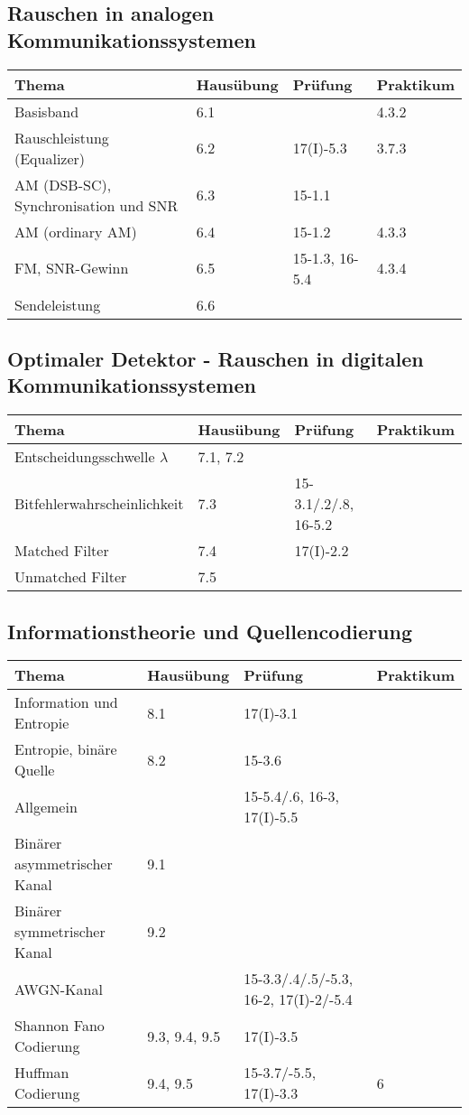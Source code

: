 \subsection{Rauschen in analogen Kommunikationssystemen}
	\begin{tabular}{|p{9cm}|p{2.5cm}|p{3.9cm}|p{1.6cm}|}
	\hline
	\textbf{Thema} & \textbf{Hausübung} & \textbf{Prüfung} & \textbf{Praktikum} \\ 
	\hline
	\hline
	Basisband & 6.1 & & 4.3.2\\
	\hline
	Rauschleistung (Equalizer) & 6.2 & 17(I)-5.3& 3.7.3\\
	\hline
	AM (DSB-SC), Synchronisation und SNR & 6.3 & 15-1.1& \\
	\hline
	AM (ordinary AM) & 6.4 & 15-1.2& 4.3.3\\
	\hline
	FM, SNR-Gewinn & 6.5 & 15-1.3, 16-5.4& 4.3.4\\
	\hline
	Sendeleistung & 6.6 & & \\
	\hline
	\end{tabular}
\subsection{Optimaler Detektor - Rauschen in digitalen Kommunikationssystemen}
	\begin{tabular}{|p{9cm}|p{2.5cm}|p{3.9cm}|p{1.6cm}|}
	\hline
	\textbf{Thema} & \textbf{Hausübung} & \textbf{Prüfung} & \textbf{Praktikum} \\ 
	\hline
	\hline
	Entscheidungsschwelle $\lambda$ & 7.1, 7.2 & & \\
	\hline
	Bitfehlerwahrscheinlichkeit & 7.3 & 15-3.1/.2/.8, 16-5.2& \\
	\hline
	Matched Filter & 7.4 & 17(I)-2.2& \\
	\hline
	Unmatched Filter & 7.5 & & \\
	\hline
	\end{tabular}
\subsection{Informationstheorie und Quellencodierung}
	\begin{tabular}{|p{9cm}|p{2.5cm}|p{3.9cm}|p{1.6cm}|}
	\hline
	\textbf{Thema} & \textbf{Hausübung} & \textbf{Prüfung} & \textbf{Praktikum} \\ 
	\hline
	\hline
	Information und Entropie & 8.1 & 17(I)-3.1& \\
	\hline
	Entropie, binäre Quelle & 8.2 & 15-3.6 & \\
	\hline
	Allgemein & & 15-5.4/.6, 16-3, 17(I)-5.5&\\
	\hline
	Binärer asymmetrischer Kanal & 9.1 & & \\
	\hline
	Binärer symmetrischer Kanal & 9.2 & & \\
	\hline
	AWGN-Kanal & & 15-3.3/.4/.5/-5.3, 16-2, 17(I)-2/-5.4 & \\
	\hline
	Shannon Fano Codierung & 9.3, 9.4, 9.5 & 17(I)-3.5 & \\
	\hline
	Huffman Codierung & 9.4, 9.5 & 15-3.7/-5.5, 17(I)-3.3& 6\\
	\hline
	\end{tabular}

